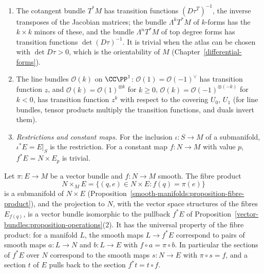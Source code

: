\begin{example}\label{vector-bundles:example-operations}
\begin{enumerate}
\item The cotangent bundle $T^*M$ has transition functions $(D\tau^T)^{-1}$, the inverse transposes of the Jacobian matrices; the bundle $\Lambda^kT^*M$ of $k$-forms has the $k \times k$
minors of these, and the bundle $\Lambda^nT^*M$ of top degree forms has transition functions $\det(D\tau)^{-1}$. It is trivial when the atlas can be chosen with $\det D\tau > 0$,
which is the orientability of $M$ (Chapter~\ref{differential-forms}).
\item The line bundles $\mathcal{O}(k)$ on $\CC\PP^1$: $\mathcal{O}(1) = \mathcal{O}(-1)^\vee$ has transition function $z$, and $\mathcal{O}(k) = \mathcal{O}(1)^{\otimes k}$ for $k \geq 0$,
$\mathcal{O}(k) = \mathcal{O}(-1)^{\otimes(-k)}$ for $k < 0$, has transition function $z^k$ with respect to the covering $U_0$, $U_1$ (for line bundles, tensor products multiply the
transition functions, and duals invert them).
\item \emph{Restrictions and constant maps.} For the inclusion $\iota \colon S \to M$ of a submanifold, $\iota^*E = E|_S$ is the restriction. For a constant map $f \colon N \to M$ with value $p$,
$f^*E = N \times E_p$ is trivial.
\end{enumerate}
\end{example}

\begin{proposition}\label{vector-bundles:proposition-pullback-fibre-product}
Let $\pi \colon E \to M$ be a vector bundle and $f \colon N \to M$ smooth. The fibre product
\[
N \times_ME = \{(q, e) \in N \times E : f(q) = \pi(e)\}
\]
is a submanifold of $N \times E$ (Proposition~\ref{smooth-manifolds:proposition-fibre-product}), and the projection to $N$, with the vector space structures of the
fibres $E_{f(q)}$, is a vector bundle isomorphic to the pullback $f^*E$ of Proposition~\ref{vector-bundles:proposition-operations}(2). It has the universal
property of the fibre product: for a manifold $L$, the smooth maps $L \to f^*E$ correspond to pairs of smooth maps $a \colon L \to N$ and $b \colon L \to E$ with
$f \circ a = \pi \circ b$. In particular the sections of $f^*E$ over $N$ correspond to the smooth maps $s \colon N \to E$ with $\pi \circ s = f$, and a section $t$ of
$E$ pulls back to the section $f^*t = t \circ f$.
\end{proposition}

